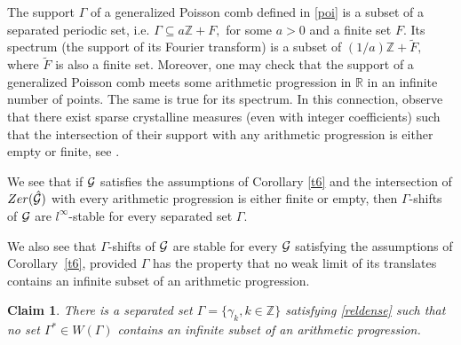 \documentclass[12pt]{amsart}
\numberwithin{equation}{section}
\newtheorem{claim}[theorem]{Claim}
\newcommand{\R}{{\mathbb R}} \newcommand{\Q}{{\mathbb Q}} \newcommand{\Z}{{\mathbb Z}} \newcommand{\N}{{\mathbb N}}
\newcommand{\Zer}{{\rm Zer}}
\begin{document}
The support $\Gamma$ of a generalized Poisson comb defined in \eqref{poi} is a subset of a separated periodic set, i.e. $\Gamma\subseteq a\Z+F,$ for some $a>0$ and a finite set $F$. Its spectrum (the support of its Fourier transform) is a subset of $(1/a)\Z+\tilde F,$ where $\tilde F$ is also a finite set. 
Moreover, one may check that the support of a generalized Poisson comb
meets some arithmetic progression in $\R$ in an infinite number of points. The same is true for its spectrum. 
In this connection, observe that there exist sparse crystalline measures (even with integer coefficients) such that the intersection of their support with any arithmetic progression is either empty or finite, see \cite{MR4129870,MR4206541}. 

We see that if $\mathcal{G}$ satisfies the assumptions of Corollary \ref{t6} and the intersection of $\Zer(\hat{\Ff})$ with every arithmetic progression is either finite or empty, then $\Gamma$-shifts of $\mathcal{G}$ are $l^{\infty}$-stable for every separated set $\Gamma$.

We also see that $\Gamma$-shifts of $\mathcal{G}$ are stable for every $\mathcal{G}$ satisfying the assumptions of  Corollary~\ref{t6}, provided $\Gamma$ has the property that no weak limit of its translates contains an infinite subset of an arithmetic progression.

\begin{claim}
  There is a separated set $\Gamma=\{\gamma_k, k\in\Z
\}$ satisfying \eqref{reldense}  such that no set $\Gamma^\ast\in W(\Gamma)$ contains an infinite subset of an arithmetic progression.  
\end{claim}
\end{document}
